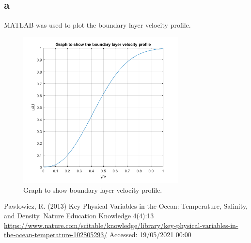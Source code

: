 \documentclass[11pt]{article}
\numberwithin{equation}{section}
\begin{document}
\subsection{a}
MATLAB was used to plot the boundary layer velocity profile.

\begin{figure}[H]
    \centering
    \includegraphics[height = 8cm]{./img/q3a.png}
    \caption{Graph to show boundary layer velocity profile.}
    \label{fig:q3a}
\end{figure}
\begin{thebibliography}{00}
     Pawlowicz, R. (2013) Key Physical Variables in the Ocean: Temperature, Salinity, and Density. Nature Education Knowledge 4(4):13 \url{https://www.nature.com/scitable/knowledge/library/key-physical-variables-in-the-ocean-temperature-102805293/} Accessed: 19/05/2021 00:00
\end{thebibliography}
\end{document}

